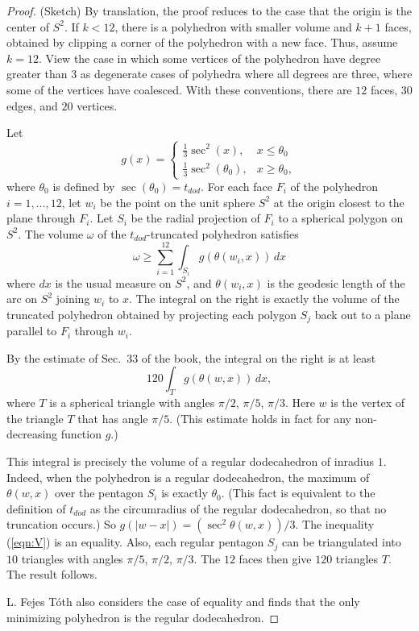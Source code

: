 \begin{proof} (Sketch)  By translation, the proof reduces to
the case that the origin is the center of $S^2$.
If $k<12$, there is a polyhedron with smaller volume and $k+1$ faces,
obtained by clipping a corner of the polyhedron with a new face.
Thus, assume $k=12$.  
View the case in which some vertices of the polyhedron
have degree greater than $3$ as degenerate cases of polyhedra 
where all degrees are three, where some of the vertices have
coalesced.   With these conventions, 
there are $12$ faces, $30$ edges,
and $20$ vertices.

Let 
  $$g(x) = \begin{cases}
          \frac13 \sec^2 (x), & x \le \theta_0\\
          \frac13 \sec^2 (\theta_0), & x \ge \theta_0,
          \end{cases}
   $$
where $\theta_0$ is defined by $\sec(\theta_0) = t_{dod}$.
For each face $F_i$ of the polyhedron $i=1,\ldots, 12$, 
let $w_i$ be the point 
on the unit sphere $S^2$ at the origin closest to the plane through $F_i$.
Let $S_i$ be the radial projection of $F_i$ to a spherical polygon
on $S^2$.   The volume $\omega$ of the $t_{dod}$-truncated polyhedron satisfies
    \begin{equation}\label{eqn:V}
    \omega \ge \sum_{i=1}^{12} \int_{S_i} g(\theta(w_i,x))\,dx
    \end{equation}
where $dx$ is the usual measure on $S^2$,
and $\theta(w_i,x)$ is the geodesic length of the arc on $S^2$ joining
$w_i$ to $x$. The integral on the
right is exactly the volume of the truncated polyhedron obtained
by projecting each polygon $S_j$ back out to a plane parallel to $F_i$
through $w_i$.

By the estimate of Sec.~33 of the book, 
the integral on the right is at least
   $$
   120 \int_{T} g(\theta(w,x))\, dx,
   $$
where $T$ is a spherical triangle with angles $\pi/2$,
$\pi/5$, $\pi/3$.  Here $w$ is the vertex of the triangle $T$
that has angle $\pi/5$.  (This estimate 
holds in fact for any non-decreasing function $g$.)

This integral is precisely the volume of a regular
dodecahedron of inradius $1$.  Indeed, when the polyhedron
is a regular dodecahedron,  the maximum of $\theta(w,x)$ over the pentagon 
$S_i$ is exactly $\theta_0$.  (This fact is equivalent to the definition of $t_{dod}$ as the circumradius of the regular
dodecahedron, so that no truncation occurs.)
So $g(|w-x|) = (\sec^2\theta(w,x))/3$.  The inequality (\ref{eqn:V})
is an equality.  Also, each regular pentagon $S_j$ can be triangulated
into $10$ triangles with angles $\pi/5$, $\pi/2$, $\pi/3$.  The
$12$ faces then give $120$ triangles $T$.  The result follows.

L. Fejes T\'oth also considers the case of equality and finds that
the only minimizing polyhedron is the regular dodecahedron.
\end{proof}



